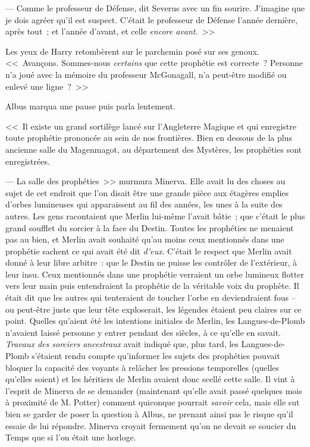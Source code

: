 --- Comme le professeur de Défense, dit Severus avec un fin sourire. J'imagine que je dois agréer qu'il est suspect. C'était le professeur de Défense l'année dernière, après tout~; et l'année d'avant, et celle \emph{encore avant}.~>>

Les yeux de Harry retombèrent sur le parchemin posé sur ses genoux. <<~Avançons. Sommes-nous \emph{certains} que cette prophétie est correcte~? Personne n'a joué avec la mémoire du professeur McGonagall, n'a peut-être modifié ou enlevé une ligne~?~>>

Albus marqua une pause puis parla lentement.

<<~Il existe un grand sortilège lancé sur l'Angleterre Magique et qui enregistre toute prophétie prononcée au sein de nos frontières. Bien en dessous de la plus ancienne salle du Magenmagot, au département des Mystères, les prophéties sont enregistrées.

--- La salle des prophéties~>> murmura Minerva. Elle avait lu des choses au sujet de cet endroit que l'on disait être une grande pièce aux étagères emplies d'orbes lumineuses qui apparaissent au fil des années, les unes à la suite des autres. Les gens racontaient que Merlin lui-même l'avait bâtie~; que c'était le plus grand soufflet du sorcier à la face du Destin. Toutes les prophéties ne menaient pas au bien, et Merlin avait souhaité qu'au moins ceux mentionnés dans une prophétie sachent ce qui avait été dit \emph{d'eux}. C'était le respect que Merlin avait donné à leur libre arbitre~: que le Destin ne puisse les contrôler de l'extérieur, à leur insu. Ceux mentionnés dans une prophétie verraient un orbe lumineux flotter vers leur main puis entendraient la prophétie de la véritable voix du prophète. Il était dit que les autres qui tenteraient de toucher l'orbe en deviendraient fous -- ou peut-être juste que leur tête exploserait, les légendes étaient peu claires sur ce point. Quelles qu'aient été les intentions initiales de Merlin, les Langues-de-Plomb n'avaient laissé personne y entrer pendant des siècles, à ce qu'elle en savait. \emph{Travaux des sorciers ancestraux} avait indiqué que, plus tard, les Langues-de-Plomb s'étaient rendu compte qu'informer les sujets des prophéties pouvait bloquer la capacité des voyants à relâcher les pressions temporelles (quelles qu'elles soient) et les héritiers de Merlin avaient donc scellé cette salle. Il vint à l'esprit de Minerva de se demander (maintenant qu'elle avait passé quelques mois à proximité de M. Potter) comment quiconque pourrait \emph{savoir} cela, mais elle sut bien se garder de poser la question à Albus, ne prenant ainsi pas le risque qu'il essaie de lui répondre. Minerva croyait fermement qu'on ne devait se soucier du Temps que si l'on était une horloge.

